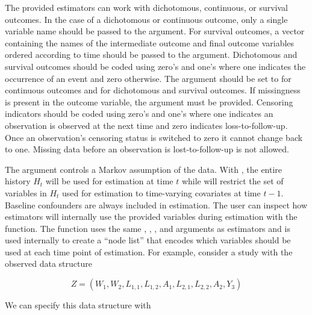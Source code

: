 \documentclass[]{jss}
\begin{document}
The provided estimators can work with dichotomous, continuous, or
survival outcomes. In the case of a dichotomous or continuous outcome,
only a single variable name should be passed to the 
argument. For survival outcomes, a vector containing the names of the
intermediate outcome and final outcome variables ordered according to
time should be passed to the  argument. Dichotomous and
survival outcomes should be coded using zero's and one's where one
indicates the occurrence of an event and zero otherwise. The
 argument should be set to  for
continuous outcomes and  for dichotomous and survival
outcomes. If missingness is present in the outcome variable, the
 argument must be provided. Censoring indicators should be
coded using zero's and one's where one indicates an observation is
observed at the next time and zero indicates loss-to-follow-up. Once an
observation's censoring status is switched to zero it cannot change back
to one. Missing data before an observation is lost-to-follow-up is not
allowed.

The  argument controls a Markov assumption of the data. With
, the entire history \(H_t\) will be used for estimation
at time \(t\) while  will restrict the set of variables in
\(H_t\) used for estimation to time-varying covariates at time \(t - 1\). 
Baseline confounders are always included in estimation. The user can inspect
how estimators will internally use the provided variables during
estimation with the  function. The
 function uses the same ,
, , and  arguments as 
estimators and is used internally to create a ``node list'' that encodes
which variables should be used at each time point of estimation. For
example, consider a study with the observed data structure

\begin{equation}
Z = (W_1, W_2, L_{1, 1}, L_{1, 2}, A_1, L_{2, 1}, L_{2, 2}, A_2, Y_3)
\end{equation}

We can specify this data structure with
\end{document}
